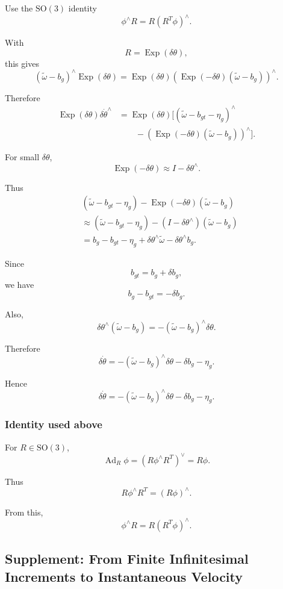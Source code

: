 \documentclass[11pt]{article}
\numberwithin{equation}{section}
\newcommand{\Exp}{\operatorname{Exp}}
\newcommand{\SO}{\mathrm{SO}}
\begin{document}
Use the $\SO(3)$ identity
\[
\phi^\wedge R
=
R(R^T\phi)^\wedge.
\]

With
\[
R=\Exp(\delta\theta),
\]
this gives
\[
(\tilde\omega-b_g)^\wedge\Exp(\delta\theta)
=
\Exp(\delta\theta)
\left(
\Exp(-\delta\theta)(\tilde\omega-b_g)
\right)^\wedge.
\]

Therefore
\begin{align}
\Exp(\delta\theta)\delta\dot\theta^\wedge
&=
\Exp(\delta\theta)
\Big[
(\tilde\omega-b_{gt}-\eta_g)^\wedge\\
&\qquad
-\left(
\Exp(-\delta\theta)(\tilde\omega-b_g)
\right)^\wedge
\Big].
\end{align}

For small $\delta\theta$,
\[
\Exp(-\delta\theta)
\approx
I-\delta\theta^\wedge.
\]

Thus
\begin{align}
&(\tilde\omega-b_{gt}-\eta_g)
-\Exp(-\delta\theta)(\tilde\omega-b_g)\\
&\approx
(\tilde\omega-b_{gt}-\eta_g)
-(I-\delta\theta^\wedge)(\tilde\omega-b_g)\\
&=
b_g-b_{gt}-\eta_g
+\delta\theta^\wedge\tilde\omega
-\delta\theta^\wedge b_g.
\end{align}

Since
\[
b_{gt}=b_g+\delta b_g,
\]
we have
\[
b_g-b_{gt}=-\delta b_g.
\]

Also,
\[
\delta\theta^\wedge(\tilde\omega-b_g)
=
-(\tilde\omega-b_g)^\wedge\delta\theta.
\]

Therefore
\[
\delta\dot\theta
=
-(\tilde\omega-b_g)^\wedge\delta\theta
-\delta b_g
-\eta_g.
\]

Hence
\begin{equation}
\boxed{
\delta\dot\theta
=
-(\tilde\omega-b_g)^\wedge\delta\theta
-\delta b_g
-\eta_g.
}
\end{equation}

\subsubsection*{Identity used above}

For $R\in\SO(3)$,
\[
\operatorname{Ad}_R\phi
=
(R\phi^\wedge R^T)^\vee
=
R\phi.
\]

Thus
\[
R\phi^\wedge R^T=(R\phi)^\wedge.
\]

From this,
\[
\phi^\wedge R
=
R(R^T\phi)^\wedge.
\]

\subsection{Supplement: From Finite Infinitesimal Increments to Instantaneous Velocity}
\end{document}
